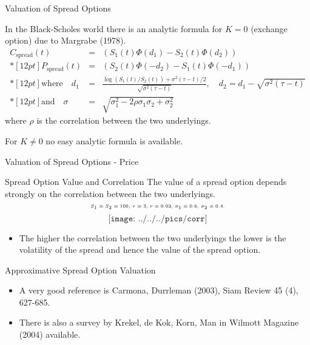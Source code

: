 {Valuation of Spread Options}

In the Black-Scholes world  there is an analytic formula for $K=0$ (exchange option) due to
Margrabe (1978).
$$\begin{array}{lll}
 C_{\mbox{spread}}(t) & = & (S_1(t)\Phi(d_1)-S_2(t)\Phi(d_2))
 \\*[12pt]
 P_{\mbox{spread}}(t) & = & (S_2(t)\Phi(-d_2)-S_1(t)\Phi(-d_1))
 \\*[12pt]
 \mbox{where}\quad d_1 & = & \frac{\log(S_1(t)/S_2(t))+\sigma^{2}(\tau-t)/2}{\sqrt{\sigma^{2}(\tau-t)}},\quad d_2=d_1-\sqrt{\sigma^{2}(\tau-t)}
 \\*[12pt]
 \mbox{and}\quad \sigma & = & \sqrt{\sigma_1^2-2\rho\sigma_1\sigma_2+\sigma_2^2}
\end{array}$$
where $\rho$ is the correlation between the two underlyings.

For $K\neq 0$ no easy analytic formula is available.

{Valuation of Spread Options - Price}

{Spread Option Value and Correlation}
The value of a spread option depends strongly on the correlation between the two underlyings.
$$\tiny\text{$S_1=S_2=100$, $\tau=3$, $r=0.02$, $\sigma_1=0.6$, $\sigma_2=0.4$.}$$
\vspace{-0.76cm}
$$\texttt{[image: ../../../pics/corr]}$$
\begin{itemize}
\vspace{-1cm}
\item The higher the correlation between the two underlyings the lower is the volatility of the spread and hence the value of the spread option.
\end{itemize}

{Approximative Spread Option Valuation}
\begin{itemize}
\item<1-> A very good reference is Carmona, Durrleman (2003), Siam Review 45 (4), 627-685.
\item<2-> There is also a survey by Krekel, de Kok, Korn, Man in Wilmott Magazine (2004) available.
\end{itemize}


